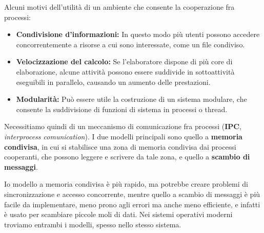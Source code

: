         Alcuni motivi dell'utilità di un ambiente che consente la cooperazione fra processi:
        \begin{itemize}
            \item \textbf{Condivisione d'informazioni:} In questo modo più utenti possono accedere concorrentemente a risorse a cui sono interessate, come un file condiviso.
            
            \item \textbf{Velocizzazione del calcolo:} Se l'elaboratore dispone di più core di elaborazione, alcune attività possono essere suddivide in sottoattività eseguibili in parallelo, causando un aumento delle prestazioni.
            
            \item \textbf{Modularità:} Può essere utile la costruzione di un sistema modulare, che consente la suddivisione di funzioni di sistema in processi o thread.
        \end{itemize}
        
        Necessitiamo quindi di un meccanismo di comunicazione fra processi (\textbf{IPC}, \textit{interprocess comunication}). I due modelli principali sono quello a \textbf{memoria condivisa}, in cui si stabilisce una zona di memoria condivisa dai processi cooperanti, che possono leggere e scrivere da tale zona, e quello a \textbf{scambio di messaggi}.
        
        Io modello a memoria condivisa è più rapido, ma potrebbe creare problemi di sincronizzazione e accesso concorrente, mentre quello a scambio di messaggi è più facile da implementare, meno prono agli errori ma anche meno efficiente, e infatti è usato per scambiare piccole moli di dati. Nei sistemi operativi moderni troviamo entrambi i modelli, spesso nello stesso sistema.